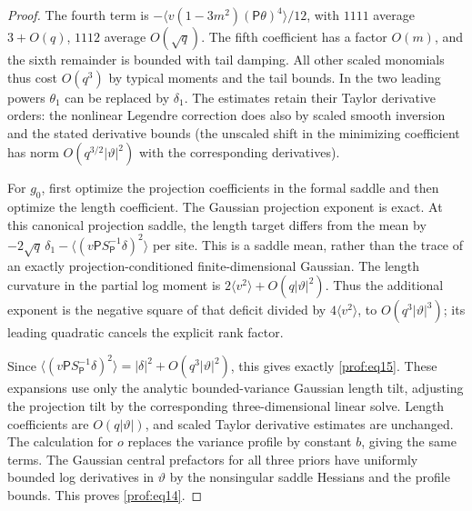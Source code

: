 \begin{proof}
The fourth term is \(-\langle v(1-3m^2)(\mathsf P\theta)^4\rangle/12\), with \(1111\) average \(3+O(q)\), \(1112\) average \(O(\sqrt q)\). The fifth coefficient has a factor \(O(m)\), and the sixth remainder is bounded with tail damping. All other scaled monomials thus cost \(O(q^3)\) by typical moments and the tail bounds. In the two leading powers \(\theta_1\) can be replaced by \(\delta_1\). The estimates retain their Taylor derivative orders: the nonlinear Legendre correction does also by scaled smooth inversion and the stated derivative bounds (the unscaled shift in the minimizing coefficient has norm \(O(q^{3/2}|\vartheta|^2)\) with the corresponding derivatives).

For \(g_0\), first optimize the projection coefficients in the
formal saddle and then optimize the length coefficient. The
Gaussian projection exponent is exact. At this canonical projection
saddle, the length target differs from the mean by
\(-2\sqrt q\,\delta_1-\langle(v\mathsf P S_{\mathsf P}^{-1}\delta)^2\rangle\)
per site. This is a saddle mean, rather than the trace of an
exactly projection-conditioned finite-dimensional Gaussian.
The length curvature in the partial log moment is
\(2\langle v^2\rangle+O(q|\vartheta|^2)\). Thus the additional
exponent is the negative square of that deficit divided by
\(4\langle v^2\rangle\), to \(O(q^3|\vartheta|^3)\); its leading
quadratic cancels the explicit rank factor.

Since \(\langle(v\mathsf P S_{\mathsf P}^{-1}\delta)^2\rangle=|\delta|^2+O(q^3|\vartheta|^2)\), this gives exactly \eqref{prof:eq15}. These expansions use only the analytic bounded-variance Gaussian length tilt, adjusting the projection tilt by the corresponding three-dimensional linear solve. Length coefficients are \(O(q |\vartheta|)\), and scaled Taylor derivative estimates are unchanged. The calculation for \(o\) replaces the variance profile by constant \(b\), giving the same terms. The Gaussian central prefactors for all three priors have uniformly bounded log derivatives in \(\vartheta\) by the nonsingular saddle Hessians and the profile bounds. This proves \eqref{prof:eq14}.


\end{proof}
